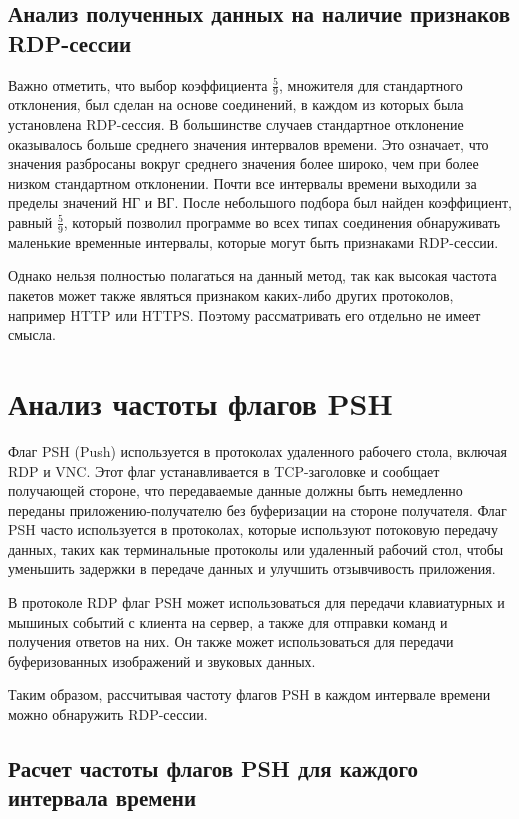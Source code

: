 \documentclass[bachelor, och, coursework]{SCWorks}
\begin{document}
\subsection{Анализ полученных данных на наличие признаков RDP-сессии}

Важно отметить, что выбор коэффициента $\frac{5}{9}$, множителя для стандартного отклонения, был сделан на основе соединений, 
в каждом из которых была установлена RDP-сессия. В большинстве случаев стандартное отклонение оказывалось больше среднего значения интервалов времени. 
Это означает, что значения разбросаны вокруг среднего значения более широко, чем при более низком стандартном отклонении. Почти все интервалы времени 
выходили за пределы значений НГ и ВГ. После небольшого подбора был найден коэффициент, равный $\frac{5}{9}$, который позволил программе во всех
типах соединения обнаруживать маленькие временные интервалы, которые могут быть признаками RDP-сессии.


Однако нельзя полностью полагаться на данный метод, так как высокая частота пакетов может также являться признаком каких-либо других протоколов, например
HTTP или HTTPS. Поэтому рассматривать его отдельно не имеет смысла. 


\section{Анализ частоты флагов PSH}


Флаг PSH (Push) используется в протоколах удаленного рабочего стола, включая RDP и VNC. 
Этот флаг устанавливается в TCP-заголовке и сообщает получающей стороне, что передаваемые данные должны 
быть немедленно переданы приложению-получателю без буферизации на стороне получателя. Флаг PSH часто 
используется в протоколах, которые используют потоковую передачу данных, таких как терминальные протоколы 
или удаленный рабочий стол, чтобы уменьшить задержки в передаче данных и улучшить отзывчивость приложения.

В протоколе RDP флаг PSH может использоваться для передачи клавиатурных и мышиных событий с клиента на сервер, 
а также для отправки команд и получения ответов на них. Он также может использоваться для передачи буферизованных 
изображений и звуковых данных. 

Таким образом, рассчитывая частоту флагов PSH в каждом интервале времени можно обнаружить RDP-сессии. 

\subsection{Расчет частоты флагов PSH для каждого интервала времени}
\end{document}
